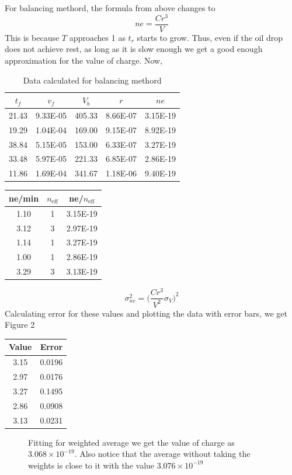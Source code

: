 \documentclass[12pt]{article}
\newlength\fwidth
\newlength\fheight
\begin{document}
For balancing methord, the formula from above changes to
\[ne =\frac{Cr^3}{V}\]
This is because $T$ approaches 1 as $t_r$ starts to grow.
Thus, even if the oil drop does not achieve rest, as long as it is slow enough we get a good enough approximation for the value of charge.
Now,
\begin{table}[H]
    \centering
    \begin{tabular}{|c|c|c|c|c|}
    \hline
        \textbf{$t_f$} & \textbf{$v_f$} & \textbf{$V_b$} & \textbf{$r$} & \textbf{$ne$} \\ \hline
        21.43 & 9.33E-05 & 405.33 & 8.66E-07 & 3.15E-19 \\ \hline
        19.29 & 1.04E-04 & 169.00 & 9.15E-07 & 8.92E-19 \\ \hline
        38.84 & 5.15E-05 & 153.00 & 6.33E-07 & 3.27E-19 \\ \hline
        33.48 & 5.97E-05 & 221.33 & 6.85E-07 & 2.86E-19 \\ \hline
        11.86 & 1.69E-04 & 341.67 & 1.18E-06 & 9.40E-19 \\ \hline
    \end{tabular}
    \caption{Data calculated for balancing methord}
\end{table}
\begin{table}[H]
    \centering
    \begin{tabular}{|c|c|c|}
    \hline
        {ne/min} & {$n_{\text{eff}}$} & {ne/$n_{\text{eff}}$} \\ \hline
        1.10 & 1 & 3.15E-19 \\ \hline
        3.12 & 3 & 2.97E-19 \\ \hline
        1.14 & 1 & 3.27E-19 \\ \hline
        1.00 & 1 & 2.86E-19 \\ \hline
        3.29 & 3 & 3.13E-19 \\ \hline
    \end{tabular}
\end{table}
\[\sigma_{ne}^2 = \bigg(\frac{Cr^3}{V^2}\sigma_V\bigg)^2\]
Calculating error for these values and plotting the data with error bars, we get Figure 2
\begin{table}[H]
    \centering
    \begin{tabular}{|c|c|}
    \hline
        Value & Error \\ \hline
        3.15 & 0.0196 \\ \hline
        2.97 & 0.0176 \\ \hline
        3.27 & 0.1495 \\ \hline
        2.86 & 0.0908 \\ \hline
        3.13 & 0.0231 \\ \hline
    \end{tabular}
\end{table}
\begin{figure}[H]
    \centering
    \setlength{}
    \setlength{}
    
    \caption{Fitting for weighted average we get the value of charge as  $3.068 \times 10^{-19}$.
     Also notice that the average without taking the weights is close to it with the value $3.076 \times 10^{-19}$}
\end{figure}
\end{document}
